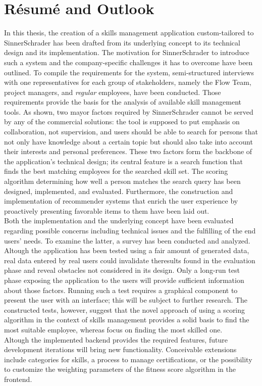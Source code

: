 \chapter{Résumé and Outlook}
In this thesis, the creation of a skills management application custom-tailored to SinnerSchrader has been drafted from its underlying concept to its technical design and its implementation. The motivation for SinnerSchrader to introduce such a system and the company-specific challenges it has to overcome have been outlined.
To compile the requirements for the system, semi-structured interviews with one representatives for each group of stakeholders, namely the Flow Team, project managers, and \textit{regular} employees, have been conducted. Those requirements provide the basis for the analysis of available skill management tools. As shown, two mayor factors required by SinnerSchrader cannot be served by any of the commercial solutions: the tool is supposed to put emphasis on collaboration, not supervision, and users should be able to search for persons that not only have knowledge about a certain topic but should also take into account their interests and personal preferences. These two factors form the backbone of the application's technical design; its central feature is a search function that finds the best matching employees for the searched skill set. The scoring algorithm determining how well a person matches the search query has been designed, implemented, and evaluated. Furthermore, the construction and implementation of recommender systems that enrich the user experience by proactively presenting favorable items to them have been laid out.\\
Both the implementation and the underlying concept have been evaluated regarding possible concerns including technical issues and the fulfilling of the end users' needs. To examine the latter, a survey has been conducted and analyzed.\\
Altough the application has been tested using a fair amount of generated data, real data entered by real users could invalidate theresults found in the evaluation phase and reveal obstacles not considered in its design. Only a long-run test phase exposing the application to the users will provide sufficient information about those factors. Running such a test requires a graphical component to present the user with an interface; this will be subject to further research.
The constructed tests, however, suggest that the novel approach of using a scoring algorithm in the context of skills management provides a solid basis to find the
most suitable employee, whereas focus on finding the most skilled one.\\
Altough the implemented backend provides the required features, future development iterations will bring new functionality. Conceivable extensions include categories for skills, a process to manage certifications, or the possibility to customize the weighting parameters of the fitness score algorithm in the frontend. 
